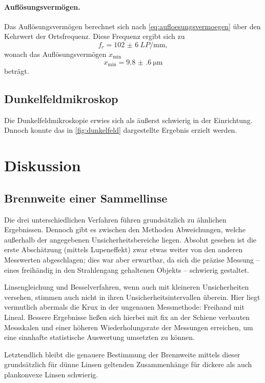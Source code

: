 \documentclass[english, ngerman]{scrartcl}
\begin{document}
\paragraph{Auflösungsvermögen.}
Das Auflösungsvermögen berechnet sich nach \autoref{eq:aufloesungsvermoegen} über den Kehrwert der Ortsfrequenz. Diese Frequenz ergibt sich zu
\[f_r = \SI{102(6)}{LP\per\milli\meter},\]
wonach das Auflösungsvermögen $x_\text{min}$
\[x_\text{min} = \SI{9.8(6)}{\micro\meter}\]
beträgt.


\subsection{Dunkelfeldmikroskop}
\label{subsec:auswertung_dunkelfeldmikroskop}

Die Dunkelfeldmikroskopie erwies sich als äußerst schwierig in der Einrichtung. Dnnoch konnte das in \autoref{fig:dunkelfeld} dargestellte Ergebnis erzielt werden.



\section{Diskussion}
\label{sec:diskussion}

\subsection{Brennweite einer Sammellinse}
\label{subsec:diskussion_sammellinse}

Die drei unterschiedlichen Verfahren führen grundsätzlich zu ähnlichen Ergebnissen. Dennoch gibt es zwischen den Methoden Abweichungen, welche außerhalb der angegebenen Unsicherheitsbereiche liegen. Absolut gesehen ist die erste Abschätzung (mittels Lupeneffekt) zwar etwas weiter von den anderen Messwerten abgeschlagen; dies war aber erwartbar, da sich die präzise Messung -- eines freihändig in den Strahlengang gehaltenen Objekts -- schwierig gestaltet.

Linsengleichung und Besselverfahren, wenn auch mit kleineren Unsicherheiten versehen, stimmen auch nicht in ihren Unsicherheitsintervallen überein. Hier liegt vermutlich abermals die Krux in der ungenauen Messmethode: Freihand mit Lineal. Bessere Ergebnisse ließen sich hierbei mit fix an der Schiene verbauten Messskalen und einer höheren Wiederholungsrate der Messungen erreichen, um eine sinnhafte statistische Auswertung umsetzten zu können.

Letztendlich bleibt die genauere Bestimmung der Brennweite mittels dieser grundsätzlich für dünne Linsen geltenden Zusammenhänge für dickere als auch plankonvexe Linsen schwierig.
\end{document}
